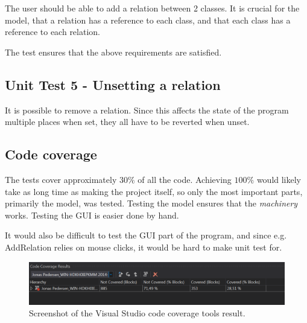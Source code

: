The user should be able to add a relation between 2 classes. It is crucial for
the model, that a relation has a reference to each class, and that each class 
has a reference to each relation.

The test ensures that the above requirements are satisfied.

\subsection{Unit Test 5 - Unsetting a relation}

It is possible to remove a relation. Since this affects the state of the program
multiple places when set, they all have to be reverted when unset.


\subsection{Code coverage}
The tests cover approximately $30\%$ of all the code. Achieving $100\%$ would
likely take as long time as making the project itself, so only the most
important parts, primarily the model, was tested. Testing the model ensures 
that the \emph{machinery} works. Testing the GUI is easier done by hand.

It would also be difficult to test the GUI part of the program, and since e.g.
AddRelation relies on mouse clicks, it would be hard to make unit test for.

\begin{figure}[H]
\centering
\includegraphics[width=0.85\linewidth]{img/coverage}
\caption{Screenshot of the Visual Studio code coverage tools result.}
\end{figure}

